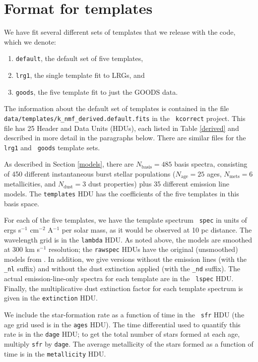 \documentclass[10pt,preprint]{aastex}
\renewcommand{\AA}{A}
\begin{document}
\section{Format for templates}
\label{format}

We have fit several different sets of templates that we release
with the code, which we denote:
\begin{enumerate}
\item {\tt default}, the default set of five templates, 
\item {\tt lrg1}, the single template fit to LRGs, and 
\item {\tt goods}, the five template fit to just the GOODS data.
\end{enumerate}
The information about the default set of templates is contained in the
file {\tt data/templates/k\_nmf\_derived.default.fits} in the {\tt
kcorrect} project.  This file has 25 Header and Data Units (HDUs),
each listed in Table \ref{derived} and described in more detail in the
paragraphs below.  There are similar files for the {\tt lrg1} and {\tt
goods} template sets.

As described in Section \ref{models}, there are $N_{\mathrm{basis}} =
485$ basis spectra, consisting of 450 different instantaneous burst
stellar populations ($N_{\mathrm{age}} = 25$ ages, $N_{\mathrm{mets}}
= 6$ metallicities, and $N_{\mathrm{dust}}=3$ dust properties) plus 35
different emission line models. The {\tt templates} HDU has the
coefficients of the five templates in this basis space. 

For each of the five templates, we have the template spectrum {\tt
spec} in units of ergs s$^{-1}$ cm$^{-2}$ \AA$^{-1}$ per solar mass,
as it would be observed at 10 pc distance. The wavelength grid is in
the {\tt lambda} HDU. As noted above, the models are smoothed at 300
km s$^{-1}$ resolution; the {\tt rawspec} HDUs have the original
(unsmoothed) models from \citet{bruzual03a}. In addition, we give
versions without the emission lines (with the {\tt \_nl} suffix) and
without the dust extinction applied (with the {\tt \_nd} suffix). The
actual emission-line-only spectra for each template are in the {\tt
lspec} HDU. Finally, the multiplicative dust extinction factor for
each template spectrum is given in the {\tt extinction} HDU.

We include the star-formation rate as a function of time in the {\tt
sfr} HDU (the age grid used is in the {\tt ages} HDU). The time
differential used to quantify this rate is in the {\tt dage} HDU; to
get the total number of stars formed at each age, multiply {\tt sfr}
by {\tt dage}. The average metallicity of the stars formed as a
function of time is in the {\tt metallicity} HDU.
\end{document}

